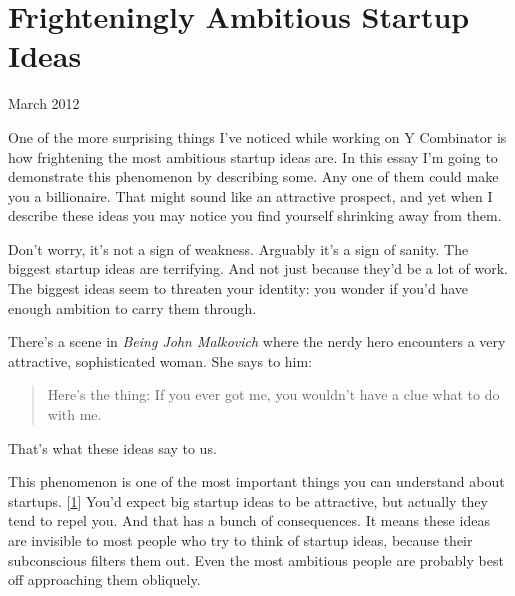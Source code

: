 \chapter{Frighteningly Ambitious Startup Ideas}


            
              
                


                  
                    March 2012

One of the more surprising things I've
                    noticed while working on Y Combinator is how frightening the
                    most ambitious startup ideas are. In this essay I'm going to
                    demonstrate this phenomenon by describing some. Any one of
                    them could make you a billionaire. That might sound like an
                    attractive prospect, and yet when I describe these ideas you
                    may notice you find yourself shrinking away from them.

Don't
                    worry, it's not a sign of weakness. Arguably it's a sign of
                    sanity. The biggest startup ideas are terrifying. And not
                    just because they'd be a lot of work. The biggest ideas seem
                    to threaten your identity: you wonder if you'd have enough
                    ambition to carry them through.

There's a scene
                    in \emph{Being John Malkovich} where the nerdy hero
                    encounters a very attractive, sophisticated woman. She says
                    to him:
                  


                  \begin{quote}

                    Here's the thing: If you ever got me, you wouldn't have a
                    clue what to do with me.
                  
\end{quote}

                  That's what these ideas say to us.

This phenomenon
                  is one of the most important things you can understand about
                  startups.
                  [\href{\#f1n}{1}]
                  You'd expect big startup ideas to be attractive, but actually
                  they tend to repel you. And that has a bunch of consequences.
                  It means these ideas are invisible to most people who try to
                  think of startup ideas, because their subconscious filters
                  them out. Even the most ambitious people are probably best off
                  approaching them obliquely.

